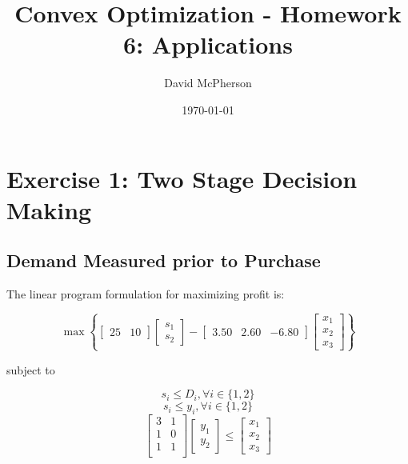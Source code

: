 \documentclass[a4paper]{article}
\title{Convex Optimization - Homework 6: Applications}
\author{David McPherson}
\date{\today}
\begin{document}
\maketitle

\section{Exercise 1: Two Stage Decision Making}
\subsection{Demand Measured prior to Purchase}

The linear program formulation for maximizing profit is:

\begin{equation}
\max \left \{ [\begin{matrix}25 & 10\end{matrix}]\left [\begin{matrix}s_1 \\ s_2 \end{matrix} \right ]
-[\begin{matrix}3.50 & 2.60 & -6.80\end{matrix}] \left [\begin{matrix}x_1 \\ x_2 \\ x_3 \end{matrix} \right ]
\right \}
\end{equation}

subject to

\begin{equation}
s_i \leq D_i , \forall i \in \{1,2\}
\end{equation}
\begin{equation}
s_i \leq y_i , \forall i \in \{1,2\}
\end{equation}
\begin{equation}
\left[
\begin{matrix}
3 & 1 \\
1 & 0 \\
1 & 1 \\
\end{matrix}
\right]
\left[\begin{matrix}y_1 \\ y_2\end{matrix}\right]
\leq
\left[\begin{matrix}x_1 \\ x_2 \\ x_3 \end{matrix}\right]
\end{equation}
\end{document}
